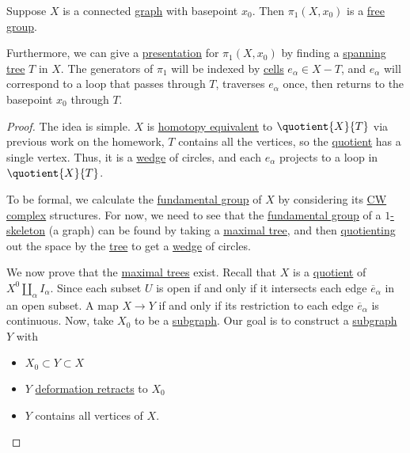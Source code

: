 \begin{corollary}
	Suppose \(X\) is a connected \hyperref[def:graph]{graph} with basepoint \(x_0\). Then \(\pi _1(X, x_0)\) is a
	\hyperref[def:free-group]{free group}.

	\par Furthermore, we can give a \hyperref[def:group-presentation]{presentation} for \(\pi _1(X, x_0)\) by finding a
	\hyperref[def:maximal-tree]{spanning tree} \(T\) in \(X\). The generators of
	\(\pi _1\) will be indexed by \hyperref[def:cell]{cells} \(e_\alpha \in X-T\), and \(e_\alpha \) will correspond to a loop that passes through \(T\),
	traverses \(e_\alpha \) once, then returns to the basepoint \(x_0\) through \(T\).
\end{corollary}
\begin{proof}
	The idea is simple. \(X\) is \hyperref[def:homotopy-equivalence]{homotopy equivalent} to \(\quotient{X}{T}\) via previous work on the homework,
	\(T\) contains all the vertices, so the \hyperref[CW-complex-quotient]{quotient} has a single vertex. Thus, it is a
	\hyperref[CW-complex-wedge-sum]{wedge} of circles, and each \(e_\alpha \) projects to a loop in \(\quotient{X}{T} \).
	\begin{figure}[H]
		\centering
		\label{fig:pf:lec12-1}
	\end{figure}

	To be formal, we calculate the \hyperref[def:fundamental-group]{fundamental group} of \(X\) by considering its \hyperref[def:CW-Complex]{CW complex} structures.
	For now, we need to see that the \hyperref[def:fundamental-group]{fundamental group} of a \hyperref[def:skeleton]{\(1\)-skeleton} (a graph) can be found by taking
	a \hyperref[def:maximal-tree]{maximal tree}, and then \hyperref[CW-complex-quotient]{quotienting} out the space by the \hyperref[def:tree]{tree}
	to get a \hyperref[CW-complex-wedge-sum]{wedge} of circles.
	\begin{figure}[H]
		\centering
		\label{fig:pf:lec12-2}
	\end{figure}

	\par We now prove that the \hyperref[def:maximal-tree]{maximal trees} exist. Recall that \(X\) is a \hyperref[CW-complex-quotient]{quotient} of
	\(X^0\coprod_\alpha I_\alpha\). Since each subset \(U\) is open if and only if it intersects each edge \(\overline{e} _\alpha \) in an open subset.
	A map \(X\to Y\) if and only if its restriction to each edge \(\overline{e} _\alpha \) is continuous. Now, take \(X_0\) to be a \hyperref[def:subgraph]{subgraph}.
	Our goal is to construct a \hyperref[def:subgraph]{subgraph} \(Y\) with
	\begin{itemize}
		\item \(X_0 \subset Y\subset X\)
		\item \(Y\) \hyperref[def:deformation-retraction]{deformation retracts} to \(X_0\)
		\item \(Y\) contains all vertices of \(X\).
	\end{itemize}


\end{proof}
